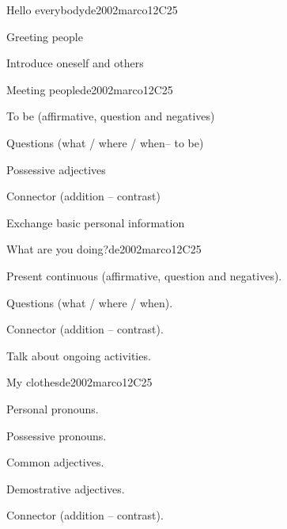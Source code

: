 \begin{syllabus}
\begin{unit}{Hello everybody}{}{de2002marco}{12}{C25}
   \begin{learningoutcomes}
      \item Greeting people
      \item Introduce oneself and others
   \end{learningoutcomes}
\end{unit}

\begin{unit}{Meeting people}{}{de2002marco}{12}{C25}
   \begin{topics}
      \item To be (affirmative, question and negatives)
      \item Questions (what / where / when– to be)
      \item Possessive adjectives
      \item Connector (addition – contrast)
   \end{topics}

   \begin{learningoutcomes}
      \item Exchange basic personal information  
   \end{learningoutcomes}

\end{unit}

\begin{unit}{What are you doing?}{}{de2002marco}{12}{C25}
   \begin{topics}
      \item Present continuous (affirmative, question and negatives).
      \item Questions (what / where / when).
      \item Connector (addition – contrast).
   \end{topics}

   \begin{learningoutcomes}
      \item Talk about ongoing activities.
   \end{learningoutcomes}

\end{unit}

\begin{unit}{My clothes}{}{de2002marco}{12}{C25}
   \begin{topics}
      \item Personal pronouns.
      \item Possessive pronouns.
      \item Common adjectives.
      \item Demostrative adjectives.
      \item Connector (addition – contrast).
   \end{topics}


\end{unit}
\end{syllabus}
